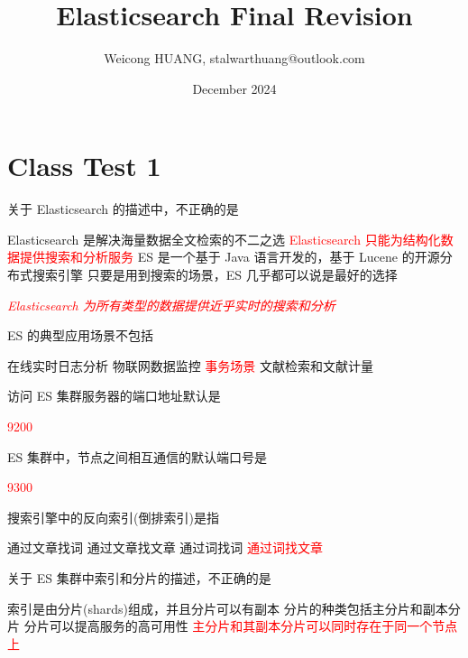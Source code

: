 \documentclass{exam}
\title{Elasticsearch Final Revision}
\author{Weicong HUANG, stalwarthuang@outlook.com}
\date{December 2024}
\begin{document}
\maketitle

\section{Class Test 1}

\begin{questions}

\question
关于 Elasticsearch 的描述中，不正确的是
\begin{choices}
    \choice Elasticsearch 是解决海量数据全文检索的不二之选
    \choice \textcolor{red}{Elasticsearch 只能为结构化数据提供搜索和分析服务}
    \choice ES 是一个基于 Java 语言开发的，基于 Lucene 的开源分布式搜索引擎
    \choice 只要是用到搜索的场景，ES 几乎都可以说是最好的选择
\end{choices}
\textit{\textcolor{red}{Elasticsearch 为所有类型的数据提供近乎实时的搜索和分析}}

\question
ES 的典型应用场景不包括
\begin{choices}
    \choice 在线实时日志分析
    \choice 物联网数据监控
    \choice \textcolor{red}{事务场景}
    \choice 文献检索和文献计量
\end{choices}

\question
访问 ES 集群服务器的端口地址默认是
\begin{choices}
    \choice \textcolor{red}{9200}
\end{choices}

\question
ES 集群中，节点之间相互通信的默认端口号是
\begin{choices}
    \choice \textcolor{red}{9300}
\end{choices}

\question
搜索引擎中的反向索引(倒排索引)是指
\begin{choices}
    \choice 通过文章找词
    \choice 通过文章找文章
    \choice 通过词找词
    \choice \textcolor{red}{通过词找文章}
\end{choices}

\question
关于 ES 集群中索引和分片的描述，不正确的是
\begin{choices}
    \choice 索引是由分片(shards)组成，并且分片可以有副本
    \choice 分片的种类包括主分片和副本分片
    \choice 分片可以提高服务的高可用性
    \choice \textcolor{red}{主分片和其副本分片可以同时存在于同一个节点上}
\end{choices}


\end{questions}
\end{document}
